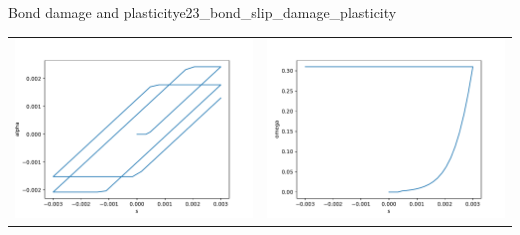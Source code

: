\documentclass[main.tex]{subfiles}
\begin{document}
\begin{bmcsex}{Bond damage and plasticity}{e23_bond_slip_damage_plasticity}
\begin{center}
\noindent
\begin{longtable}{L{7.5cm}L{7.5cm}}
\includegraphics[width=7.5cm]{examples/e23_bond_slip_damage_plasticity/fig_alpha-s.pdf}
 & 
\includegraphics[width=7.5cm]{examples/e23_bond_slip_damage_plasticity/fig_omega-s.pdf}
 \\\end{longtable}
\end{center}
            \end{bmcsex}
\end{document}
